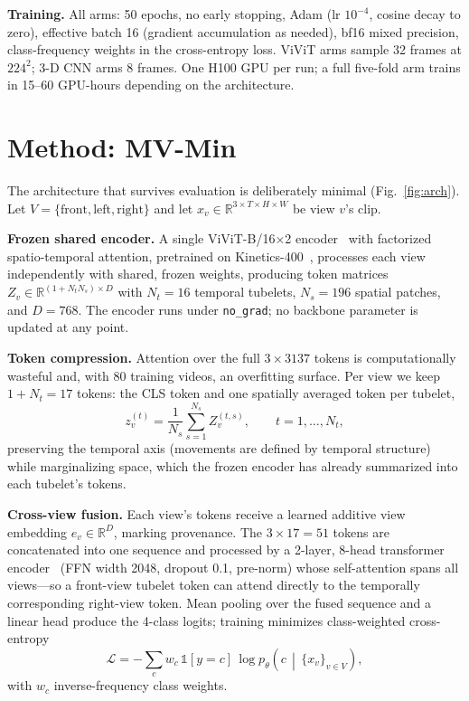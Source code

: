 \documentclass[journal]{IEEEtran}
\newcommand{\mvmin}{MV-Min}
\begin{document}
\textbf{Training.}  All arms: 50 epochs, no early stopping, Adam
(lr $10^{-4}$, cosine decay to zero), effective batch 16 (gradient
accumulation as needed), bf16 mixed precision, class-frequency weights in
the cross-entropy loss.  ViViT arms sample 32 frames at $224^2$; 3-D CNN
arms 8 frames.  One H100 GPU per run; a full five-fold arm trains in
15--60 GPU-hours depending on the architecture.

\section{Method: \mvmin{}}
\label{sec:method}
The architecture that survives evaluation is deliberately minimal
(Fig.~\ref{fig:arch}).  Let $V{=}\{\text{front},\text{left},\text{right}\}$
and let $x_v\in\mathbb{R}^{3\times T\times H\times W}$ be view $v$'s clip.

\textbf{Frozen shared encoder.}  A single ViViT-B/16$\times$2
encoder~\cite{arnab2021vivit} with factorized spatio-temporal attention,
pretrained on Kinetics-400~\cite{kay2017kinetics}, processes each view
independently with shared, frozen weights, producing token matrices
$Z_v\in\mathbb{R}^{(1+N_tN_s)\times D}$ with $N_t{=}16$ temporal tubelets,
$N_s{=}196$ spatial patches, and $D{=}768$.  The encoder runs under
\texttt{no\_grad}; no backbone parameter is updated at any point.

\textbf{Token compression.}  Attention over the full $3\times3137$ tokens is
computationally wasteful and, with 80 training videos, an overfitting
surface.  Per view we keep $1{+}N_t{=}17$ tokens: the CLS token and one
spatially averaged token per tubelet,
\begin{equation}
z_v^{(t)}=\frac{1}{N_s}\sum_{s=1}^{N_s}Z_v^{(t,s)},\qquad t=1,\dots,N_t,
\end{equation}
preserving the temporal axis (movements are defined by temporal structure)
while marginalizing space, which the frozen encoder has already summarized
into each tubelet's tokens.

\textbf{Cross-view fusion.}  Each view's tokens receive a learned additive
view embedding $e_v\in\mathbb{R}^{D}$, marking provenance.  The
$3\times17{=}51$ tokens are concatenated into one sequence and processed by
a 2-layer, 8-head transformer encoder~\cite{vaswani2017attention} (FFN
width 2048, dropout 0.1, pre-norm) whose self-attention spans all
views---so a front-view tubelet token can attend directly to the temporally
corresponding right-view token.  Mean pooling over the fused sequence and a
linear head produce the 4-class logits; training minimizes class-weighted
cross-entropy
\begin{equation}
\mathcal{L}=-\sum_{c} w_c\,\mathbb{1}[y{=}c]\,
\log p_\theta\!\left(c\,\middle|\,\{x_v\}_{v\in V}\right),
\end{equation}
with $w_c$ inverse-frequency class weights.
\end{document}
